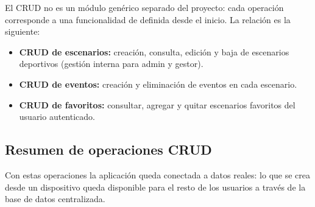 El CRUD no es un m\'odulo gen\'erico separado del proyecto: cada
operaci\'on corresponde a una funcionalidad de \nombreApp{} definida desde
el inicio. La relaci\'on es la siguiente:

\begin{itemize}
  \item \textbf{CRUD de escenarios:} creaci\'on, consulta, edici\'on y
    baja de escenarios deportivos (gesti\'on interna para admin y gestor).
  \item \textbf{CRUD de eventos:} creaci\'on y eliminaci\'on de eventos en
    cada escenario.
  \item \textbf{CRUD de favoritos:} consultar, agregar y quitar
    escenarios favoritos del usuario autenticado.
\end{itemize}

\subsection{Resumen de operaciones CRUD}

\begin{table}[H]
  \centering
  \caption{Resumen de operaciones CRUD implementadas}
\end{table}

Con estas operaciones la aplicaci\'on queda conectada a datos reales:
lo que se crea desde un dispositivo queda disponible para el resto de los
usuarios a trav\'es de la base de datos centralizada.